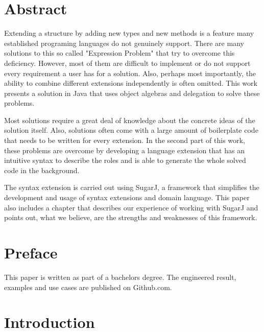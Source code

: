 \documentclass{report}
\begin{document}
\chapter*{Abstract}
Extending a structure by adding new types and new methods is a feature many established programing languages do not genuinely support. There are many solutions to this so called "Expression Problem" that try to overcome this deficiency. However, most of them are difficult to implement or do not support every requirement a user has for a solution. Also, perhaps most importantly, the ability to combine different extensions independently is often omitted. This work presents a solution in Java that uses object algebras and delegation to solve these problems.

Most solutions require a great deal of knowledge about the concrete ideas of the solution itself. Also, solutions often come with a large amount of boilerplate code that needs to be written for every extension. In the second part of this work, these problems are overcome by developing a language extension that has an intuitive syntax to describe the roles and is able to generate the whole solved code in the background.

The syntax extension is carried out using SugarJ, a framework that simplifies the development and usage of syntax extensions and domain language. This paper also includes a chapter that describes our experience of working with SugarJ and points out, what we believe, are the strengths and weaknesses of this framework.

\tableofcontents

\chapter*{Preface}

This paper is written as part of a bachelors degree. The engineered result, examples and use cases are published on Github.com\cite{Peuscher-GitHub-EP-2014}.%



\chapter*{Introduction}
\end{document}
